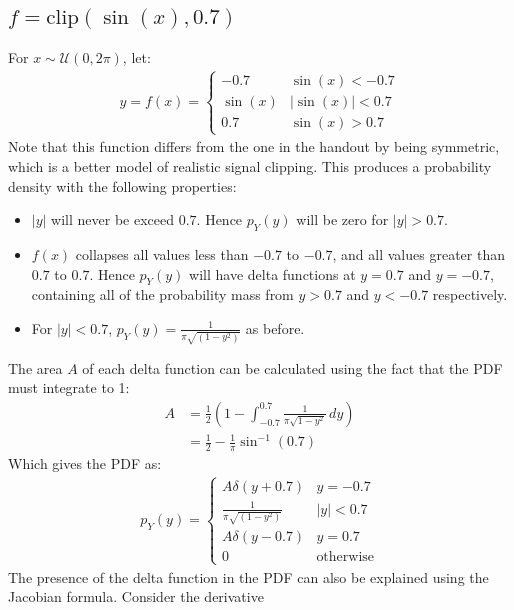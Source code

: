 \documentclass[a4paper]{article}
\begin{document}
\subsection{$f = \text{clip}(\sin(x), 0.7)$}
For $x \sim \mathcal{U}(0, 2\pi)$, let:
\begin{align*}
    y = f(x) = \begin{cases}
                   -0.7 & \sin(x) < -0.7 \\
                   \sin(x) & |\sin(x)| < 0.7 \\
                   0.7 & \sin(x) > 0.7
               \end{cases}
\end{align*}
Note that this function differs from the one in the handout by being symmetric, which is a better model of realistic
signal clipping.
This produces a probability density with the following properties:
\begin{itemize}
    \item $|y|$ will never be exceed $0.7$. Hence $p_Y(y)$ will be zero for $|y| > 0.7$.
    \item $f(x)$ collapses all values less than $-0.7$ to $-0.7$, and all values greater than $0.7$ to $0.7$. Hence
          $p_Y(y)$ will have delta functions at $y = 0.7$ and $y = -0.7$, containing all of the probability mass
          from $y > 0.7$ and $y < -0.7$ respectively.
    \item For $|y| < 0.7$, $p_Y(y) = \frac{1}{\pi \sqrt{\left(1- y^2\right)}}$ as before.
\end{itemize}
The area $A$ of each delta function can be calculated using the fact that the PDF must integrate to 1:
\begin{align*}
    A &= \frac{1}{2}\left(1 - \int_{-0.7}^{0.7} \frac{1}{\pi\sqrt{1 - y^2}}\,dy \right) \\
    &= \frac{1}{2} - \frac{1}{\pi} \sin^{-1}(0.7)
\end{align*}
Which gives the PDF as:
\begin{align*}
    p_Y(y) = \begin{cases}
                 A \delta(y + 0.7) & y = -0.7 \\
                 \frac{1}{\pi \sqrt{\left(1- y^2\right)}} & |y| < 0.7 \\
                 A \delta(y - 0.7) & y = 0.7 \\
                 0 & \text{otherwise}
             \end{cases}
\end{align*}
The presence of the delta function in the PDF can also be explained using the Jacobian formula. Consider the derivative
\end{document}
